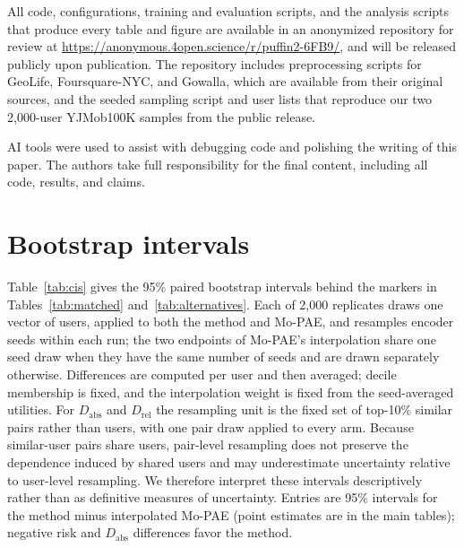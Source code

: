 \documentclass[sigconf,anonymous,review]{acmart}
\begin{document}
\begin{openscience}
All code, configurations, training and evaluation scripts, and the analysis scripts that produce every table and figure are available in an anonymized repository for review at \url{https://anonymous.4open.science/r/puffin2-6FB9/}, and will be released publicly upon publication. The repository includes preprocessing scripts for GeoLife, Foursquare-NYC, and Gowalla, which are available from their original sources, and the seeded sampling script and user lists that reproduce our two 2{,}000-user YJMob100K samples from the public release.
\end{openscience}

\begin{ai}
AI tools were used to assist with debugging code and polishing the writing of this paper. The authors take full responsibility for the final content, including all code, results, and claims.
\end{ai}





\section{Bootstrap intervals}
\label{app:cis}
Table~\ref{tab:cis} gives the 95\% paired bootstrap intervals behind the markers in Tables~\ref{tab:matched} and~\ref{tab:alternatives}. Each of 2{,}000 replicates draws one vector of users, applied to both the method and Mo-PAE, and resamples encoder seeds within each run; the two endpoints of Mo-PAE's interpolation share one seed draw when they have the same number of seeds and are drawn separately otherwise. Differences are computed per user and then averaged; decile membership is fixed, and the interpolation weight is fixed from the seed-averaged utilities. For $D_{\mathrm{abs}}$ and $D_{\mathrm{rel}}$ the resampling unit is the fixed set of top-10\% similar pairs rather than users, with one pair draw applied to every arm. Because similar-user pairs share users, pair-level resampling does not preserve the dependence induced by shared users and may underestimate uncertainty relative to user-level resampling. We therefore interpret these intervals descriptively rather than as definitive measures of uncertainty. Entries are 95\% intervals for the method minus interpolated Mo-PAE (point estimates are in the main tables); negative risk and $D_{\mathrm{abs}}$ differences favor the method.
\end{document}
